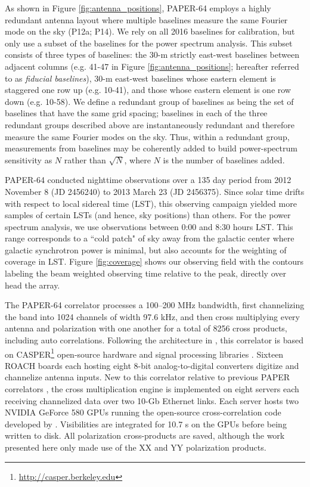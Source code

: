 \documentclass[twocolumn,numberedappendix]{emulateapj} \shorttitle{New Limits on the 21 cm Power Spectrum at $z=8.4$}
\begin{document}
As shown in Figure \ref{fig:antenna_positions}, PAPER-64 employs
a highly redundant antenna layout where multiple baselines measure
the same Fourier mode on the sky (P12a; P14).
We rely on all 2016 baselines for calibration,
but only use a subset of the baselines for the power spectrum
analysis. This subset consists of three types of baselines: the 30-m
strictly east-west baselines between adjacent columns (e.g. 41-47
in Figure \ref{fig:antenna_positions}; hereafter referred to 
as {\it fiducial baselines}), 30-m east-west baselines
whose eastern element is staggered one row up (e.g. 10-41), and
those whose eastern element is one row down (e.g. 10-58).
We define a redundant group of
baselines as being the set of baselines that have the same grid spacing;
baselines in each
of the three redundant groups described above are instantaneously redundant and
therefore measure the same Fourier modes on the sky. Thus, within a redundant group,
measurements from baselines may be 
coherently added to build power-spectrum sensitivity as $N$ rather than
$\sqrt{N}$, where $N$ is the number of baselines added.  

PAPER-64 conducted nighttime observations over a 135 day period 
from 2012 November 8 (JD 2456240) to 2013 March 23 (JD 2456375). 
Since solar time drifts with respect to local sidereal time (LST), this observing campaign
yielded more samples of certain LSTs (and hence, sky positions) than others. 
For the power spectrum analysis, we use observations between 0:00 and 8:30 hours
LST.  This range corresponds to
a ``cold patch" of sky away from the galactic center where galactic synchrotron power is minimal,
but also accounts for the weighting of coverage in LST.
Figure \ref{fig:coverage} shows our observing field with the contours labeling
the beam weighted observing time relative to the peak, directly over head the
array.

The PAPER-64 correlator processes a 100--200 MHz bandwidth, first
channelizing the band into 1024 channels of width 97.6 kHz, and then
cross multiplying every antenna and polarization with one another for a total of
8256 cross products, including auto correlations.  Following the architecture 
in \citet{parsons_et_al2008}, this
correlator is based on CASPER\footnote{\url{http://casper.berkeley.edu}} open-source
hardware and signal processing libraries \citep{parsons_et_al2006}.  
Sixteen ROACH boards each hosting eight 8-bit analog-to-digital
converters digitize and channelize antenna inputs. New to this correlator relative to previous PAPER correlators \citep{parsons_et_al2010},
the cross multiplication engine is implemented on eight servers each receiving
channelized data over two 10-Gb Ethernet links.  Each server hosts
two NVIDIA GeForce 580 GPUs running the open-source cross-correlation code developed
by \citet{clark_et_al2013}.
Visibilities are integrated for 10.7 s on the GPUs before
being written to disk.  All polarization cross-products are saved, although the
work presented here only made use of the XX and YY polarization products.
\end{document}
